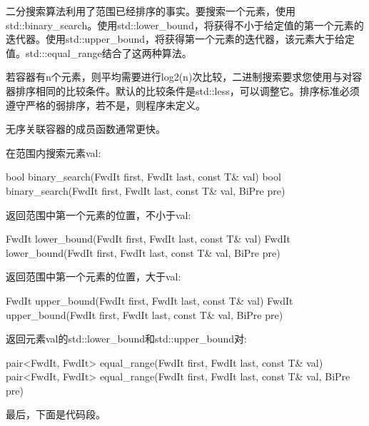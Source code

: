 二分搜索算法利用了范围已经排序的事实。要搜索一个元素，使用std::binary\_search。使用std::lower\_bound，将获得不小于给定值的第一个元素的迭代器。使用std::upper\_bound，将获得第一个元素的迭代器，该元素大于给定值。std:::equal\_range结合了这两种算法。

若容器有n个元素，则平均需要进行log2(n)次比较，二进制搜索要求您使用与对容器排序相同的比较条件。默认的比较条件是std::less，可以调整它。排序标准必须遵守严格的弱排序，若不是，则程序未定义。

无序关联容器的成员函数通常更快。

在范围内搜索元素val:

\begin{cpp}
bool binary_search(FwdIt first, FwdIt last, const T& val)
bool binary_search(FwdIt first, FwdIt last, const T& val, BiPre pre)
\end{cpp}

返回范围中第一个元素的位置，不小于val:

\begin{cpp}
FwdIt lower_bound(FwdIt first, FwdIt last, const T& val)
FwdIt lower_bound(FwdIt first, FwdIt last, const T& val, BiPre pre)
\end{cpp}

返回范围中第一个元素的位置，大于val:

\begin{cpp}
FwdIt upper_bound(FwdIt first, FwdIt last, const T& val)
FwdIt upper_bound(FwdIt first, FwdIt last, const T& val, BiPre pre)
\end{cpp}

返回元素val的std::lower\_bound和std::upper\_bound对:

\begin{cpp}
pair<FwdIt, FwdIt> equal_range(FwdIt first, FwdIt last, const T& val)
pair<FwdIt, FwdIt> equal_range(FwdIt first, FwdIt last, const T& val, BiPre pre)
\end{cpp}

最后，下面是代码段。


